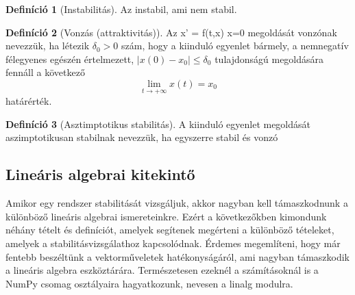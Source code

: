 \documentclass{article}
\theoremstyle{definition}
\theoremstyle{theorem}
\newtheorem{definition}{Definíció}
\begin{document}
\begin{definition}[Instabilitás]
Az instabil, ami nem stabil.
\end{definition}

\begin{definition}[Vonzás (attraktivitás)]
Az x' = f(t,x) x=0 megoldását vonzónak nevezzük, ha létezik
$\delta_0 > 0$ szám, hogy a kiinduló egyenlet bármely,  a nemnegatív félegyenes egészén értelmezett, $|x(0) - x_0| \leq \delta_0$ tulajdonságú megoldására fennáll a következő
\begin{equation*}
    \lim_{t \rightarrow + \infty} x(t) = x_0
\end{equation*}
határérték.
\end{definition}
\begin{definition}[Asztimptotikus stabilitás]
A kiinduló egyenlet megoldását aszimptotikusan stabilnak nevezzük, ha egyszerre stabil és vonzó
\end{definition}

\subsection{Lineáris algebrai kitekintő}
Amikor egy rendszer stabilitását vizsgáljuk, akkor nagyban kell támaszkodnunk a különböző lineáris algebrai ismereteinkre. Ezért a következőkben kimondunk néhány tételt és definíciót, amelyek segítenek megérteni a különböző tételeket, amelyek a stabilitásvizsgálathoz kapcsolódnak. Érdemes megemlíteni, hogy már fentebb beszéltünk a vektorműveletek hatékonyságáról, ami nagyban támaszkodik a lineáris algebra eszköztárára. Természetesen ezeknél a számításoknál is a NumPy csomag osztályaira hagyatkozunk, nevesen a linalg modulra.
\end{document}
